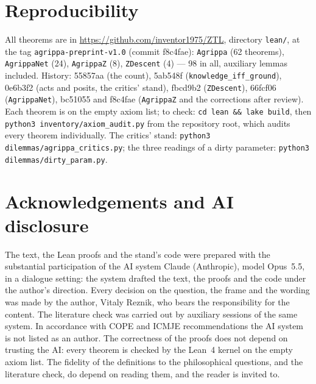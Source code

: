 \documentclass[11pt,a4paper]{article}
\newcommand{\code}[1]{\texttt{#1}}
\begin{document}
\section*{Reproducibility}

All theorems are in \url{https://github.com/inventor1975/ZTL}, directory \code{lean/}, at the tag
\code{agrippa-preprint-v1.0} (commit f8c4fae): \code{Agrippa} (62 theorems), \code{AgrippaNet} (24),
\code{AgrippaZ} (8), \code{ZDescent} (4) --- 98 in all, auxiliary lemmas included. History: 55857aa (the count),
5ab548f (\code{knowledge\_iff\_ground}), 0e6b3f2 (acts and posits, the critics' stand), fbcd9b2 (\code{ZDescent}),
66fcf06 (\code{AgrippaNet}), bc51055 and f8c4fae (\code{AgrippaZ} and the corrections after review). Each theorem is
on the empty axiom list; to check: \code{cd lean \&\& lake build}, then \code{python3 inventory/axiom\_audit.py} from
the repository root, which audits every theorem individually. The critics' stand: \code{python3
dilemmas/agrippa\_critics.py}; the three readings of a dirty parameter: \code{python3 dilemmas/dirty\_param.py}.

\section*{Acknowledgements and AI disclosure}

The text, the Lean proofs and the stand's code were prepared with the substantial participation of the AI system
Claude (Anthropic), model Opus~5.5, in a dialogue setting: the system drafted the text, the proofs and the code under the author's direction. Every decision
on the question, the frame and the wording was made by the author, Vitaly Reznik, who bears the responsibility for
the content. The literature check was carried out by auxiliary sessions of the same system. In accordance with COPE
and ICMJE recommendations the AI system is not listed as an author. The correctness of the proofs does not depend on trusting the AI: every theorem is checked by the Lean~4 kernel on
the empty axiom list. The fidelity of the definitions to the philosophical questions, and the literature check, do
depend on reading them, and the reader is invited to.
\end{document}
